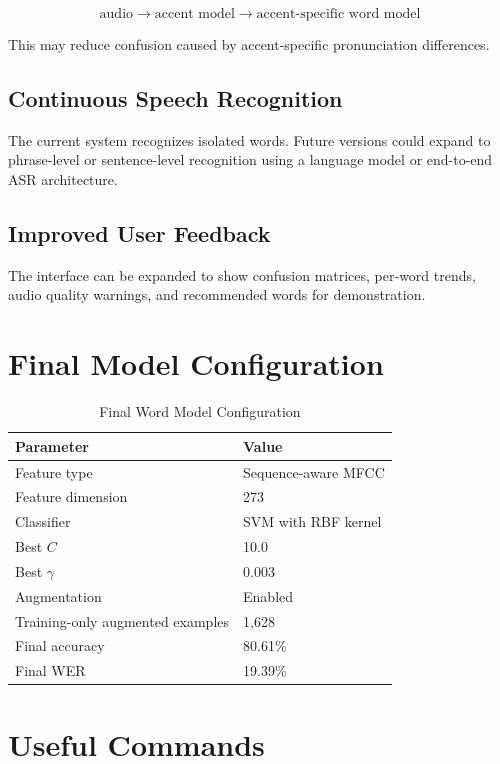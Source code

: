 \documentclass[12pt,a4paper]{report}
\begin{document}
\[
\text{audio} \rightarrow \text{accent model} \rightarrow \text{accent-specific word model}
\]

This may reduce confusion caused by accent-specific pronunciation differences.

\section{Continuous Speech Recognition}
The current system recognizes isolated words. Future versions could expand to phrase-level or sentence-level recognition using a language model or end-to-end ASR architecture.

\section{Improved User Feedback}
The interface can be expanded to show confusion matrices, per-word trends, audio quality warnings, and recommended words for demonstration.

\appendix

\chapter{Final Model Configuration}

\begin{table}[h]
\centering
\caption{Final Word Model Configuration}
\begin{tabular}{ll}
\toprule
\textbf{Parameter} & \textbf{Value} \\
\midrule
Feature type & Sequence-aware MFCC \\
Feature dimension & 273 \\
Classifier & SVM with RBF kernel \\
Best \(C\) & 10.0 \\
Best \(\gamma\) & 0.003 \\
Augmentation & Enabled \\
Training-only augmented examples & 1,628 \\
Final accuracy & 80.61\% \\
Final WER & 19.39\% \\
\bottomrule
\end{tabular}
\end{table}

\chapter{Useful Commands}
\end{document}
